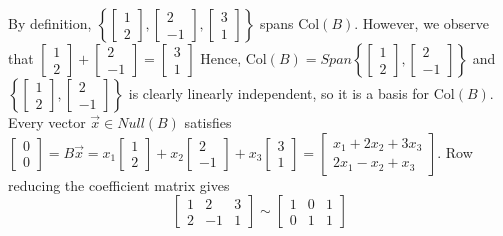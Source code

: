 \documentclass[10pt,letter]{article}
\begin{document}
By definition, $\left\{\begin{bmatrix}1\\2\end{bmatrix},\begin{bmatrix}2\\-1\end{bmatrix},\begin{bmatrix}3\\1\end{bmatrix}\right\}$ spans Col$(B)$. However, we observe that $\begin{bmatrix}1\\2\end{bmatrix}+\begin{bmatrix}2\\-1\end{bmatrix}=\begin{bmatrix}3\\1\end{bmatrix}$ Hence, Col$(B)=Span\left\{\begin{bmatrix}1\\2\end{bmatrix},\begin{bmatrix}2\\-1\end{bmatrix}\right\}$ and $\left\{\begin{bmatrix}1\\2\end{bmatrix},\begin{bmatrix}2\\-1\end{bmatrix}\right\}$ is clearly linearly independent, so it is a basis for Col$(B)$. \\ 
Every vector $\vec{x}\in Null(B)$ satisfies $\begin{bmatrix}0\\0\end{bmatrix}=B\vec{x}=x_1\begin{bmatrix}1\\2\end{bmatrix}+x_2\begin{bmatrix}2\\-1\end{bmatrix}+x_3\begin{bmatrix}3\\1\end{bmatrix}=\begin{bmatrix}x_1+2x_2+3x_3\\2x_1-x_2+x_3\end{bmatrix}$. Row reducing the coefficient matrix gives $$\begin{bmatrix}1&2&3\\2&-1&1\end{bmatrix}\sim\begin{bmatrix}1&0&1\\0&1&1\end{bmatrix}$$
\end{document}
